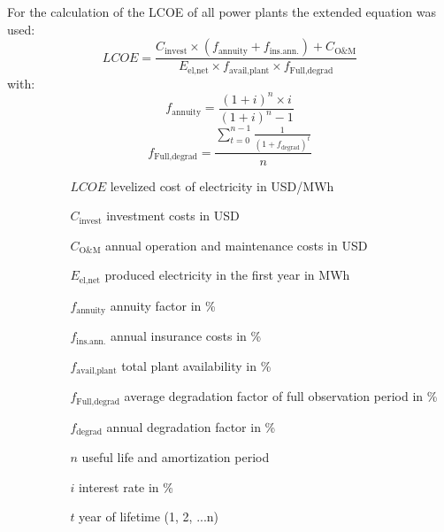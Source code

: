For the calculation of the LCOE of all power plants the extended equation was used:
\begin{equation}
LCOE=\frac{ C_{\text{invest}} \times (f_{\text{annuity}}+f_{\text{ins.ann.}}) + C_{\text{O\&M}} }   { E_{\text{el,net}} \times f_{\text{avail,plant}} \times f_{\text{Full,degrad}} } \label{eq:LCOE}
\end{equation}
with:
\begin{equation}
f_{\text{annuity}} = \frac{(1+i)^n \times i}{(1+i)^n-1} \label{annuity}
\end{equation}
\begin{equation}
f_{\text{Full,degrad}} = \frac{\sum\limits_{t=0}^{n-1} \frac{1}{(1+f_{\text{degrad}})^{t}}}{n} \label{GL_Degradationfactor}
\end{equation} 
\begin{itemize}
\item[ ] 
\begin{itemize}
\item[ ] 
\begin{itemize}
\item[$LCOE$]levelized cost of electricity in USD/MWh
\item[$C_{\text{invest}}$]investment costs in USD
\item[$C_{\text{O\&M}}$]annual operation and maintenance costs in USD
\item[$E_{\text{el,net}}$]produced electricity in the first year in MWh
\item[$f_{\text{annuity}}$]annuity factor in \%
\item[$f_{\text{ins.ann.}}$]annual insurance costs in \%
\item[$f_{\text{avail,plant}}$]total plant availability in \%
\item[$f_{\text{Full,degrad}}$]average degradation factor of full observation period in \%
\item[$f_{\text{degrad}}$]annual degradation factor in \%
\item[$n$]useful life and amortization period
\item[$i$]interest rate in \%
\item[$t$]year of lifetime (1, 2, ...n)
\end{itemize}
\end{itemize}
\end{itemize}
\pagebreak
